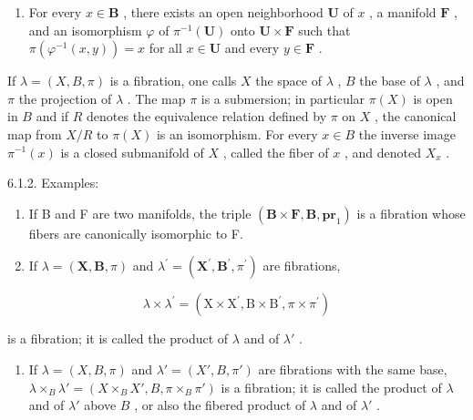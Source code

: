 \begin{enumerate}
\def\labelenumi{(\Alph{enumi})}
\setcounter{enumi}{5}
\tightlist
\item
  For every \(x \in \mathbf{B}\) , there exists an open neighborhood \(\mathbf{U}\) of \(x\) , a manifold \(\mathbf{F}\) , and an isomorphism \(\varphi\) of \(\pi^{-1}(\mathbf{U})\) onto \(\mathbf{U} \times \mathbf{F}\) such that \(\pi(\varphi^{-1}(x, y)) = x\) for all \(x \in \mathbf{U}\) and every \(y \in \mathbf{F}\) .
\end{enumerate}

If \(\lambda = (X, B, \pi)\) is a fibration, one calls \(X\) the space of \(\lambda\) , \(B\) the base of \(\lambda\) , and \(\pi\) the projection of \(\lambda\) . The map \(\pi\) is a submersion; in particular \(\pi(X)\) is open in \(B\) and if \(R\) denotes the equivalence relation defined by \(\pi\) on \(X\) , the canonical map from \(X/R\) to \(\pi(X)\) is an isomorphism. For every \(x \in B\) the inverse image \(\pi^{-1}(x)\) is a closed submanifold of \(X\) , called the fiber of \(x\) , and denoted \(X_x\) .

6.1.2. Examples:

\begin{enumerate}
\def\labelenumi{(\alph{enumi})}
\item
  If B and F are two manifolds, the triple \((\mathbf{B} \times \mathbf{F}, \mathbf{B}, \mathbf{pr}_{1})\) is a fibration whose fibers are canonically isomorphic to F.
\item
  If \(\lambda = (\mathbf{X},\mathbf{B},\pi)\) and \(\lambda^{\prime} = (\mathbf{X}^{\prime},\mathbf{B}^{\prime},\pi^{\prime})\) are fibrations,
\end{enumerate}

\[
\lambda \times \lambda^ {\prime} = (\mathrm{X} \times \mathrm{X} ^ {\prime}, \mathrm{B} \times \mathrm{B} ^ {\prime}, \pi \times \pi^ {\prime})
\]

is a fibration; it is called the product of \(\lambda\) and of \(\lambda'\) .

\begin{enumerate}
\def\labelenumi{(\alph{enumi})}
\setcounter{enumi}{2}
\tightlist
\item
  If \(\lambda = (X, B, \pi)\) and \(\lambda' = (X', B, \pi')\) are fibrations with the same base, \(\lambda \times_{B} \lambda' = (X \times_{B} X', B, \pi \times_{B} \pi')\) is a fibration; it is called the product of \(\lambda\) and of \(\lambda'\) above \(B\) , or also the fibered product of \(\lambda\) and of \(\lambda'\) .
\end{enumerate}

